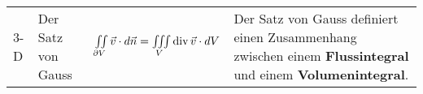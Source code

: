 \begin{tabular}{|p{0.4cm}||p{4cm}|p{5.7cm}|p{7cm}|}
\begin{minipage}{7cm}
	    \vspace{0.1cm}   
    \end{minipage}\\
	\hline
	\begin{sideways}3-D \qquad \end{sideways} &
	Der Satz von Gauss \formelbuch{96} &
	\begin{minipage}{6.7cm}
	    \vspace{0.1cm}
		$\iint\limits_{\partial V}\vec{v}\cdot d\vec{n}=\iiint\limits_V \operatorname{div}
		\vec{v}\cdot dV$			    
	    \vspace{0.1cm}   
    \end{minipage}&
	\begin{minipage}{7cm}
    	\vspace{0.1cm}
		Der Satz von Gauss definiert einen Zusammenhang zwischen einem
		\textbf{Flussintegral} und einem \textbf{Volumenintegral}.	    
	    \vspace{0.1cm}    
    \end{minipage}\\
	\hline	
\end{tabular}
